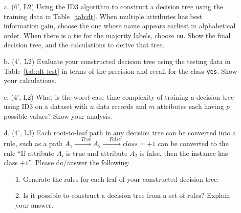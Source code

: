 \documentclass[12pt,letterpaper]{article}
\begin{document}
				\begin{itemize}
					\item[a.] (6', L2) Using the ID3 algorithm to construct a decision tree using the training data in Table~\ref{tab:dt}. When multiple attributes has best information gain, choose the one whose name appears earliest in alphabetical order. When there is a tie for the majority labels, choose {\tt no}. Show the final decision tree, and the calculations to derive that tree.
					
					\item[b.] (4', L2) Evaluate your constructed decision tree using the testing data in Table~\ref{tab:dt-test} in terms of the precision and recall for the class {\tt yes}. Show your calculations.
					\item[c.] (4', L2) What is the worst case time complexity of training a decision tree using ID3 on a dataset with $n$ data records and $m$ attributes each having $p$ possible values? Show your analysis.
					\item[d.] (4', L3) Each root-to-leaf path in any decision tree can be converted into a rule, such as a path $A_1\xrightarrow{=True}A_2\xrightarrow{=False} class=+1$ can be converted to the rule ``If attribute $A_i$ is true and attribute $A_2$ is false, then the instance has class $+1$''. Please do/answer the following:
					\begin{itemize}
						\item[1.] Generate the rules for each leaf of your constructed decision tree.
						\item[2.] Is it possible to construct a decision tree from a set of rules? Explain your answer.
					\end{itemize} 
				\end{itemize}
				
				
\end{document}
